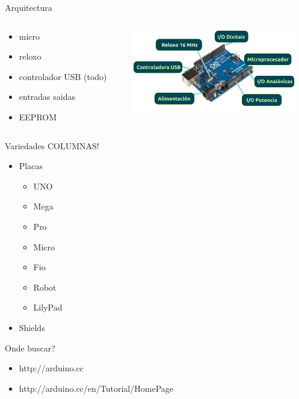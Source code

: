 \documentclass{beamer}
\begin{document}
\begin{frame}{Arquitectura}
\begin{columns}[t]
	\begin{column}[t]{0.4\textwidth}
		\begin{itemize}
			\item micro
			\item reloxo
			\item controlador USB (todo)
			\item entradas saidas
			\item EEPROM
		\end{itemize}
	\end{column}
	\begin{column}[t]{0.6\textwidth}
		\includegraphics[width=200pt]{./img/arduinoUNOExplicado.png}
	\end{column}
\end{columns}
\end{frame}

\begin{frame}{Variedades}
COLUMNAS!
\begin{itemize}
 \item Placas
 \begin{itemize}
  \item UNO
  \item Mega
  \item Pro
  \item Micro
  \item Fio
  \item Robot
  \item LilyPad
 \end{itemize}

 \item Shields
\end{itemize}
\end{frame}

\begin{frame}{Onde buscar?}
\begin{itemize}
	\item http://arduino.cc
	\item http://arduino.cc/en/Tutorial/HomePage

\end{itemize}

\end{frame}
\end{document}
